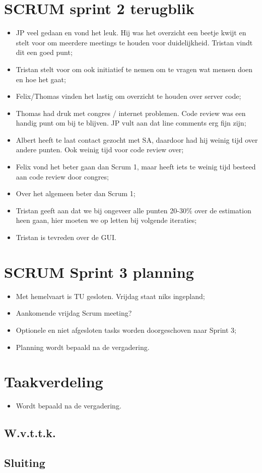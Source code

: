 \documentclass[a4paper]{article}
\begin{document}
\section{SCRUM sprint 2 terugblik}
\begin{itemize}
\item JP veel gedaan en vond het leuk. Hij was het overzicht een beetje kwijt en stelt voor om meerdere meetings te houden voor duidelijkheid. Tristan vindt dit een goed punt;
\item Tristan stelt voor om ook initiatief te nemen om te vragen wat mensen doen en hoe het gaat;
\item Felix/Thomas vinden het lastig om overzicht te houden over server code;
\item Thomas had druk met congres / internet problemen. Code review was een handig punt om bij te blijven. JP vult aan dat line comments erg fijn zijn;
\item Albert heeft te laat contact gezocht met SA, daardoor had hij weinig tijd over andere punten. Ook weinig tijd voor code review over;
\item Felix vond het beter gaan dan Scrum 1, maar heeft iets te weinig tijd besteed aan code review door congres;
\item Over het algemeen beter dan Scrum 1;
\item Tristan geeft aan dat we bij ongeveer alle punten 20-30\% over de estimation heen gaan, hier moeten we op letten bij volgende iteraties;
\item Tristan is tevreden over de GUI.
\end{itemize}

\section{SCRUM Sprint 3 planning}
\begin{itemize}
\item Met hemelvaart is TU gesloten. Vrijdag staat niks ingepland;
\item Aankomende vrijdag Scrum meeting?
\item Optionele en niet afgesloten tasks worden doorgeschoven naar Sprint 3;
\item Planning wordt bepaald na de vergadering.
\end{itemize}

\section{Taakverdeling}
\begin{itemize}
\item Wordt bepaald na de vergadering.
\end{itemize}

\subsection*{W.v.t.t.k.}
\subsection*{Sluiting}
\end{document}
